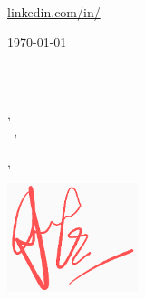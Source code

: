 \documentclass[12pt]{letter}
\begin{document}
\AddToShipoutPictureBG{%
\color{gr}
\AtPageUpperLeft{\rule[-1.3in]{\paperwidth}{1.3in}}
}

\begin{center}
{\fontsize{28}{0}\selectfont\scshape\myname}\\
\vspace{5px}
\href{mailto:\myemail}{\faEnvelope\enspace\myemail}\hfill
\href{https://linkedin.com/in/\mylinkedin}{\faLinkedinIn\enspace linkedin.com/in/\mylinkedin}\hfill\enspace\enspace\enspace
\href{tel:\myphone}{\enspace\faPhone\enspace\myphone}\hfill\\
\vspace{4px}
\faMapMarker\enspace\mylocation
\end{center}

\vspace{0.2in}

\today\\

\vspace{-0.1in}\recipient\\
\company\\
\street\\
\city, \state\ \zip\\

\vspace{-0.1in}\greeting\ \recipient,\\

\vspace{-0.1in}\setlength\parindent{24pt}
\noindent

\vspace{0.1in}
\vfill

\begin{flushright}
\closure,

\vspace{-0.1in}\includegraphics[width=1.5in]{../sig.png}\vspace{-0.1in}

\myname\\
\mytitle
\end{flushright}
\end{document}
